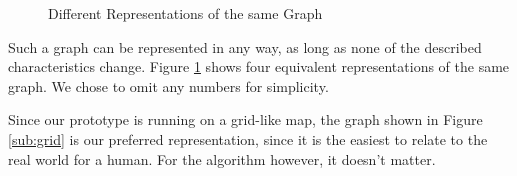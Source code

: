 \begin{figure}[h!tp]
    \centering
  	\caption{Different Representations of the same Graph}
  	\label{fig:graphs}
\end{figure}

Such a graph can be represented in any way,
as long as none of the described characteristics change.
Figure \ref{fig:graphs} shows four equivalent representations of the same graph.
We chose to omit any numbers for simplicity.

Since our prototype is running on a grid-like map,
the graph shown in Figure \ref{sub:grid} is our preferred representation,
since it is the easiest to relate to the real world for a human.
For the algorithm however, it doesn't matter.
\\\\
